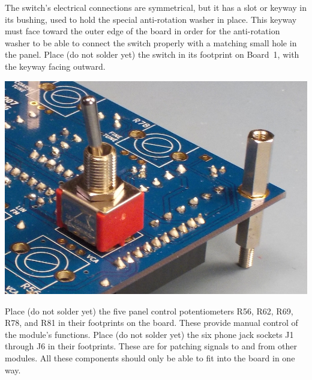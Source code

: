The switch's electrical connections are symmetrical, but it has a slot or
keyway in its bushing, used to hold the special anti-rotation washer in
place.  This keyway must face toward the outer edge of the board in order
for the anti-rotation washer to be able to connect \pagebreak the switch
properly with a matching small hole in the panel.  Place (do not solder yet)
the switch in its footprint on Board~1, with the keyway facing outward.

\nopagebreak
\noindent\includegraphics[width=\linewidth]{switch-keyway.jpg}

Place (do not solder yet) the five panel control potentiometers R56, R62,
R69, R78, and R81 in their footprints on the board.  These provide manual
control of the module's functions.  Place (do not solder
yet) the six phone jack sockets J1 through J6 in their footprints.  These
are for patching signals to and from other modules.  All these components
should only be able to fit into the board in one way.

